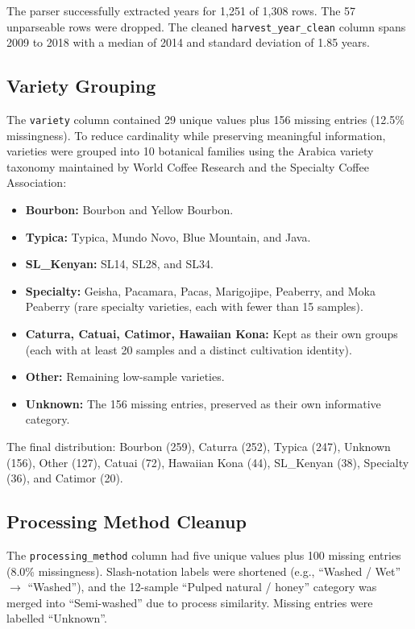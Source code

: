 \documentclass[12pt, a4paper]{article}
\begin{document}
The parser successfully extracted years for 1,251 of 1,308 rows. The 57 unparseable rows were
dropped. The cleaned \texttt{harvest\_year\_clean} column spans 2009 to 2018 with a median of
2014 and standard deviation of 1.85 years.

\subsection{Variety Grouping}

The \texttt{variety} column contained 29 unique values plus 156 missing entries (12.5\%
missingness). To reduce cardinality while preserving meaningful information, varieties were grouped
into 10 botanical families using the Arabica variety taxonomy maintained by World Coffee Research
and the Specialty Coffee Association:

\begin{itemize}
  \item \textbf{Bourbon:} Bourbon and Yellow Bourbon.
  \item \textbf{Typica:} Typica, Mundo Novo, Blue Mountain, and Java.
  \item \textbf{SL\_Kenyan:} SL14, SL28, and SL34.
  \item \textbf{Specialty:} Geisha, Pacamara, Pacas, Marigojipe, Peaberry, and Moka Peaberry
        (rare specialty varieties, each with fewer than 15 samples).
  \item \textbf{Caturra, Catuai, Catimor, Hawaiian Kona:} Kept as their own groups (each with at
        least 20 samples and a distinct cultivation identity).
  \item \textbf{Other:} Remaining low-sample varieties.
  \item \textbf{Unknown:} The 156 missing entries, preserved as their own informative category.
\end{itemize}

The final distribution: Bourbon (259), Caturra (252), Typica (247), Unknown (156), Other (127),
Catuai (72), Hawaiian Kona (44), SL\_Kenyan (38), Specialty (36), and Catimor (20).

\subsection{Processing Method Cleanup}

The \texttt{processing\_method} column had five unique values plus 100 missing entries
(8.0\% missingness). Slash-notation labels were shortened (e.g., ``Washed / Wet'' $\to$
``Washed''), and the 12-sample ``Pulped natural / honey'' category was merged into
``Semi-washed'' due to process similarity. Missing entries were labelled ``Unknown''.
\end{document}
